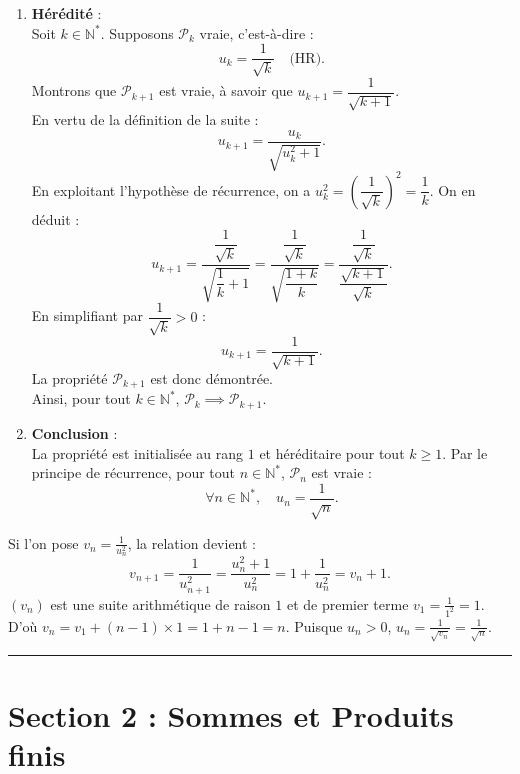 \documentclass[11pt,a4paper]{article}
\newcommand{\N}{\mathbb{N}}
\begin{document}
\begin{correctionbox}
\begin{enumerate}[label=\textbf{\arabic*.}]
    \item \textbf{Hérédité} :\\
    Soit $k \in \N^*$. Supposons $\mathcal{P}_k$ vraie, c'est-à-dire :
    \[
    u_k = \frac{1}{\sqrt{k}} \quad \text{(HR)}.
    \]
    Montrons que $\mathcal{P}_{k+1}$ est vraie, à savoir que $u_{k+1} = \dfrac{1}{\sqrt{k+1}}$.\\
    En vertu de la définition de la suite :
    \[
    u_{k+1} = \frac{u_k}{\sqrt{u_k^2 + 1}}.
    \]
    En exploitant l'hypothèse de récurrence, on a $u_k^2 = \left(\dfrac{1}{\sqrt{k}}\right)^2 = \dfrac{1}{k}$. On en déduit :
    \[
    u_{k+1} = \frac{\dfrac{1}{\sqrt{k}}}{\sqrt{\dfrac{1}{k} + 1}} = \frac{\dfrac{1}{\sqrt{k}}}{\sqrt{\dfrac{1+k}{k}}} = \frac{\dfrac{1}{\sqrt{k}}}{\dfrac{\sqrt{k+1}}{\sqrt{k}}}.
    \]
    En simplifiant par $\dfrac{1}{\sqrt{k}} > 0$ :
    \[
    u_{k+1} = \frac{1}{\sqrt{k+1}}.
    \]
    La propriété $\mathcal{P}_{k+1}$ est donc démontrée.\\
    Ainsi, pour tout $k \in \N^*$, $\mathcal{P}_k \implies \mathcal{P}_{k+1}$.

    \item \textbf{Conclusion} :\\
    La propriété est initialisée au rang $1$ et héréditaire pour tout $k \ge 1$. Par le principe de récurrence, pour tout $n \in \N^*$, $\mathcal{P}_n$ est vraie :
    \[
    \forall n \in \N^*, \quad u_n = \frac{1}{\sqrt{n}}.
    \]
\end{enumerate}
\end{correctionbox}

\begin{remarquabox}
Si l'on pose $v_n = \frac{1}{u_n^2}$, la relation devient :
\[
v_{n+1} = \frac{1}{u_{n+1}^2} = \frac{u_n^2 + 1}{u_n^2} = 1 + \frac{1}{u_n^2} = v_n + 1.
\]
$(v_n)$ est une suite arithmétique de raison $1$ et de premier terme $v_1 = \frac{1}{1^2} = 1$.
D'où $v_n = v_1 + (n-1) \times 1 = 1 + n - 1 = n$.
Puisque $u_n > 0$, $u_n = \frac{1}{\sqrt{v_n}} = \frac{1}{\sqrt{n}}$.
\end{remarquabox}

\vspace{1cm}
\hrule
\vspace{1cm}
\section{Section 2 : Sommes et Produits finis}

\end{document}
